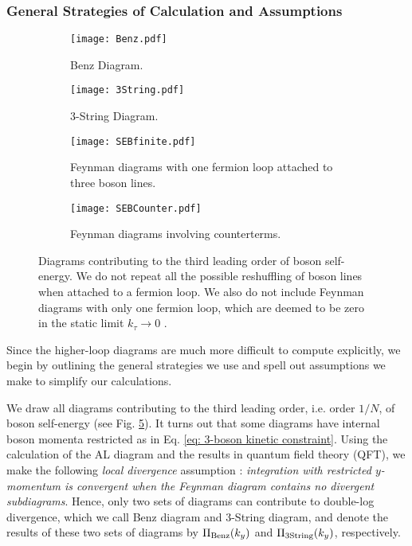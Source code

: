 \documentclass[prx,amsmath,amssymb, notitlepage, onecolumn,
nofootinbib,
superscriptaddress,
longbibliography
]{revtex4-1}
\begin{document}
\subsubsection{General Strategies of Calculation and Assumptions}\label{subsubapp: general strategies}

\begin{figure}[!htbp]
     \centering
     \begin{subfigure}[h]{0.45\textwidth}
     	\centering
     	\texttt{[image: Benz.pdf]}
     	\caption{Benz Diagram.}
     	\label{FD: Benz-app}
     \end{subfigure}
    \begin{subfigure}[h]{0.45\textwidth}
 	\centering
 	\texttt{[image: 3String.pdf]}
 	\caption{3-String Diagram.}
 	\label{FD: 3String}
   \end{subfigure}
 
     \begin{subfigure}[h]{\textwidth}
         \centering
         \texttt{[image: SEBfinite.pdf]}
         \caption{Feynman diagrams with one fermion loop attached to three boson lines.}
         \label{FD: SEFf}
     \end{subfigure}   
     \begin{subfigure}[h]{\textwidth}
         \centering
         \texttt{[image: SEBCounter.pdf]}
         \caption{Feynman diagrams involving counterterms.}
         \label{FD: SEFC}
     \end{subfigure}
        \caption{Diagrams contributing to the third leading order of boson self-energy. We do not repeat all the possible reshuffling of boson lines when attached to a fermion loop. We also do not include Feynman diagrams with only one fermion loop, which are deemed to be zero in the static limit $k_\tau\rightarrow 0$ \cite{Lee2009,Metlitski2010}.}
        \label{FD: all 1/N boson self-energy diagrams}
\end{figure}

Since the higher-loop diagrams are much more difficult to compute explicitly, we begin by outlining  the general strategies we use and spell out assumptions we make to simplify our calculations. 

We draw all diagrams contributing to the third leading order, i.e. order $1/N$, of boson self-energy (see Fig. \ref{FD: all 1/N boson self-energy diagrams}). It turns out that some diagrams have internal boson momenta restricted as in Eq. \eqref{eq: 3-boson kinetic constraint}. 
Using the calculation of the AL diagram and the results in quantum field theory (QFT), we make the following {\it local divergence} assumption : {\it integration with restricted $y$-momentum is convergent when the Feynman diagram contains no divergent subdiagrams}. 
Hence, only two sets of diagrams can contribute to double-log divergence, which we call Benz diagram and 3-String diagram, and denote the results of these two sets of diagrams by $\Pi_{\rm Benz}(k_y)$ and $\Pi_{\rm 3String}(k_y)$, respectively.
\end{document}
